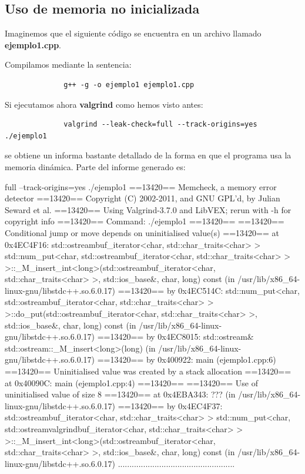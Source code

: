 \documentclass[11pt,a4paper,professionalfonts]{article}
\begin{document}
\subsection{Uso de memoria no inicializada}

Imaginemos que el siguiente código se encuentra en un archivo llamado 
\textbf{ejemplo1.cpp}.


Compilamos mediante la sentencia:

\begin{verbatim}
              g++ -g -o ejemplo1 ejemplo1.cpp
\end{verbatim}

Si ejecutamos ahora \textbf{valgrind} como hemos visto antes:

\begin{verbatim}
              valgrind --leak-check=full --track-origins=yes ./ejemplo1
\end{verbatim}

\noindent se obtiene un informa bastante detallado de la forma en que el programa usa
la memoria dinámica. Parte del informe generado es:

\vspace{0.4cm}
\begin{javacode}
full --track-origins=yes ./ejemplo1
==13420== Memcheck, a memory error detector
==13420== Copyright (C) 2002-2011, and GNU GPL'd, by Julian Seward et al.
==13420== Using Valgrind-3.7.0 and LibVEX; rerun with -h for copyright info
==13420== Command: ./ejemplo1
==13420== 
==13420== Conditional jump or move depends on uninitialised value(s)
==13420==    at 0x4EC4F16: std::ostreambuf_iterator<char, std::char_traits<char> > std::num_put<char, std::ostreambuf_iterator<char, std::char_traits<char> > >::_M_insert_int<long>(std::ostreambuf_iterator<char, std::char_traits<char> >, std::ios_base&, char, long) const (in /usr/lib/x86_64-linux-gnu/libstdc++.so.6.0.17)
==13420==    by 0x4EC514C: std::num_put<char, std::ostreambuf_iterator<char, std::char_traits<char> > >::do_put(std::ostreambuf_iterator<char, std::char_traits<char> >, std::ios_base&, char, long) const (in /usr/lib/x86_64-linux-gnu/libstdc++.so.6.0.17)
==13420==    by 0x4EC8015: std::ostream& std::ostream::_M_insert<long>(long) (in /usr/lib/x86_64-linux-gnu/libstdc++.so.6.0.17)
==13420==    by 0x400922: main (ejemplo1.cpp:6)
==13420==  Uninitialised value was created by a stack allocation
==13420==    at 0x40090C: main (ejemplo1.cpp:4)
==13420== 
==13420== Use of uninitialised value of size 8
==13420==    at 0x4EBA343: ??? (in /usr/lib/x86_64-linux-gnu/libstdc++.so.6.0.17)
==13420==    by 0x4EC4F37: std::ostreambuf_iterator<char, std::char_traits<char> > std::num_put<char, std::ostreamvalgrindbuf_iterator<char, std::char_traits<char> > >::_M_insert_int<long>(std::ostreambuf_iterator<char, std::char_traits<char> >, std::ios_base&, char, long) const (in /usr/lib/x86_64-linux-gnu/libstdc++.so.6.0.17)
...................................................
\end{javacode}
\vspace{0.4cm}
\end{document}
